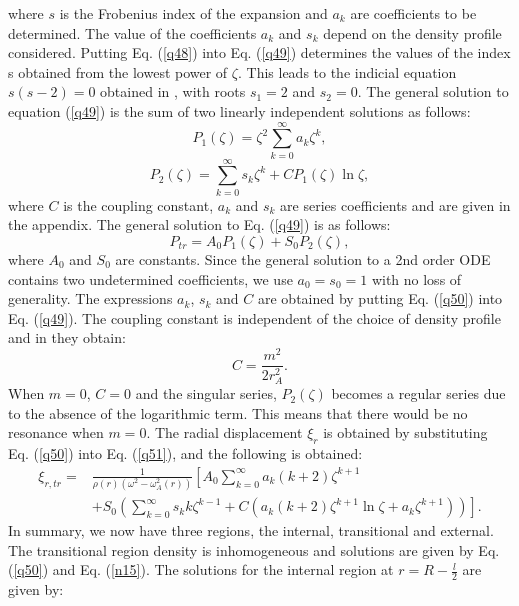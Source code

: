 \documentclass[12pt,a4paper,twoside]{article}
\begin{document}
where $s$ is the Frobenius  index of the expansion and $a_k$ are coefficients to be determined. The value of the coefficients $a_k$ and $s_k$ depend on the density profile considered. Putting Eq. (\ref{q48}) into Eq. (\ref{q49}) determines the values of the index s obtained from the lowest power of $\zeta$. This leads to the indicial equation $s(s-2)=0$ obtained in \cite{Soler_2013}, with roots $s_1 =2$ and $s_2 = 0$. The general solution to equation (\ref{q49}) is the sum of two linearly independent solutions as follows:
\begin{equation}
P_1(\zeta) = \zeta^2 \sum^{\infty}_{k=0} a_k \zeta^k ,
\end{equation}
\begin{equation}
P_2(\zeta) = \sum^{\infty}_{k=0} s_k \zeta^k+ C P_1(\zeta) \ln \zeta ,
\end{equation}
where $C$ is the coupling constant, $a_k$ and $s_k$ are series coefficients and are given in the appendix. The general solution to Eq. (\ref{q49}) is as follows:
\begin{equation}\label{q50}
P_{tr} = A_0 P_1(\zeta)+S_0 P_2(\zeta) , 
\end{equation}
where $A_0$ and $S_0$ are constants. Since the general solution to a 2nd order ODE contains two undetermined coefficients, we use $a_0=s_0=1$ with no loss of generality. The expressions $a_k$, $s_k$ and $C$ are obtained by putting Eq. (\ref{q50}) into Eq. (\ref{q49}). The coupling constant is independent of the choice of density profile and in \cite{Soler_2013} they obtain:
\begin{equation}
C = \frac{m^2}{2 r_A^2} .
\end{equation}
When $m=0$, $C=0$ and the singular series, $P_2(\zeta)$ becomes a regular series due to the absence of the logarithmic term. This means that there would be no resonance when $m=0$. The radial displacement $\xi_r$ is obtained by substituting Eq. (\ref{q50}) into Eq. (\ref{q51}), and the following is obtained: 
\begin{equation}\label{n15}
\begin{split}
\xi_{r,tr} = & \frac{1}{\rho(r)(\omega^2-\omega_A^2(r))} \left[ A_0 \sum^{\infty}_{k=0}a_k(k+2)\zeta^{k+1} \right. \\ & \left. +S_0 \left( \sum^{\infty}_{k=0} s_k k \zeta^{k-1} + C \left( a_k(k+2) \zeta^{k+1} \ln \zeta + a_k \zeta^{k+1} \right) \right)  \right] .
\end{split}
\end{equation}
In summary, we now have three regions, the internal, transitional and external. The transitional region density is inhomogeneous and solutions are given by Eq. (\ref{q50}) and Eq. (\ref{n15}). The solutions for the internal region at $r = R - \frac{l}{2}$ are given by:
\end{document}
